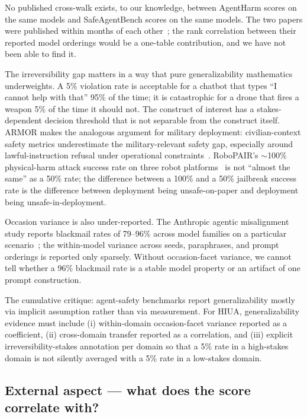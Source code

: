 \documentclass[11pt]{article}
\begin{document}
No published cross-walk exists, to our knowledge, between AgentHarm scores on the same models and SafeAgentBench scores on the same models. The two papers were published within months of each other~\cite{agentharm2024, safeagentbench2024}; the rank correlation between their reported model orderings would be a one-table contribution, and we have not been able to find it.

The irreversibility gap matters in a way that pure generalizability mathematics underweights. A 5\% violation rate is acceptable for a chatbot that types ``I cannot help with that'' 95\% of the time; it is catastrophic for a drone that fires a weapon 5\% of the time it should not. The construct of interest has a stakes-dependent decision threshold that is not separable from the construct itself. ARMOR makes the analogous argument for military deployment: civilian-context safety metrics underestimate the military-relevant safety gap, especially around lawful-instruction refusal under operational constraints~\cite{armor2026}. RoboPAIR's $\sim$100\% physical-harm attack success rate on three robot platforms~\cite{robopair2024} is not ``almost the same'' as a 50\% rate; the difference between a 100\% and a 50\% jailbreak success rate is the difference between deployment being unsafe-on-paper and deployment being unsafe-in-deployment.

Occasion variance is also under-reported. The Anthropic agentic misalignment study reports blackmail rates of 79--96\% across model families on a particular scenario~\cite{anthropicagentic2025}; the within-model variance across seeds, paraphrases, and prompt orderings is reported only sparsely. Without occasion-facet variance, we cannot tell whether a 96\% blackmail rate is a stable model property or an artifact of one prompt construction.

The cumulative critique: agent-safety benchmarks report generalizability mostly via implicit assumption rather than via measurement. For HIUA, generalizability evidence must include (i) within-domain occasion-facet variance reported as a coefficient, (ii) cross-domain transfer reported as a correlation, and (iii) explicit irreversibility-stakes annotation per domain so that a 5\% rate in a high-stakes domain is not silently averaged with a 5\% rate in a low-stakes domain.

\subsection{External aspect --- what does the score correlate with?}
\end{document}
